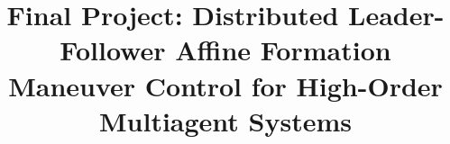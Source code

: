 \documentclass[conference]{IEEEtran}
\begin{document}
\title{Final Project: Distributed Leader-Follower Affine Formation Maneuver Control for High-Order Multiagent Systems}

\author{
}



\date{{}}
\maketitle
%     







\end{document}
